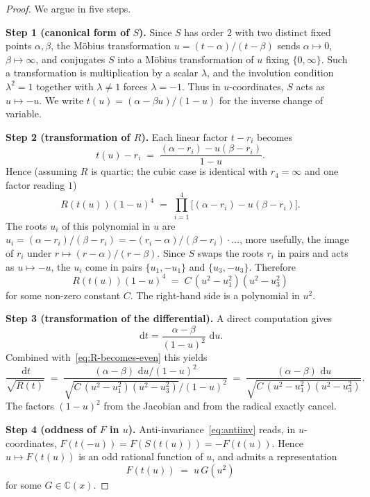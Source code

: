 \documentclass[11pt,a4paper]{article}
\theoremstyle{plain}
\theoremstyle{definition}
\theoremstyle{remark}
\newcommand{\C}{\mathbb{C}}
\renewcommand{\d}{\,\mathrm{d}}
\begin{document}
\begin{proof}
We argue in five steps.

\smallskip\noindent
\textbf{Step 1 (canonical form of $S$).}
Since $S$ has order $2$ with two distinct fixed points $\alpha,\beta$, the M\"obius transformation $u = (t-\alpha)/(t-\beta)$ sends $\alpha\mapsto 0$, $\beta\mapsto\infty$, and conjugates $S$ into a M\"obius transformation of $u$ fixing $\{0,\infty\}$. Such a transformation is multiplication by a scalar $\lambda$, and the involution condition $\lambda^2=1$ together with $\lambda\neq 1$ forces $\lambda = -1$. Thus in $u$-coordinates, $S$ acts as $u\mapsto -u$. We write $t(u) = (\alpha-\beta u)/(1-u)$ for the inverse change of variable.

\smallskip\noindent
\textbf{Step 2 (transformation of $R$).}
Each linear factor $t-r_i$ becomes
\[
  t(u) - r_i \;=\; \frac{(\alpha-r_i) - u(\beta-r_i)}{1-u}.
\]
Hence (assuming $R$ is quartic; the cubic case is identical with $r_4=\infty$ and one factor reading $1$)
\[
  R(t(u))(1-u)^4 \;=\; \prod_{i=1}^4 \big[(\alpha-r_i) - u(\beta-r_i)\big].
\]
The roots $u_i$ of this polynomial in $u$ are $u_i = (\alpha-r_i)/(\beta-r_i) = -(r_i-\alpha)/(\beta-r_i) \cdot \ldots$, more usefully, the image of $r_i$ under $r\mapsto (r-\alpha)/(r-\beta)$. Since $S$ swaps the roots $r_i$ in pairs and acts as $u\mapsto -u$, the $u_i$ come in pairs $\{u_1,-u_1\}$ and $\{u_3,-u_3\}$. Therefore
\begin{equation}\label{eq:R-becomes-even}
  R(t(u))(1-u)^4 \;=\; C\,(u^2 - u_1^2)(u^2 - u_3^2)
\end{equation}
for some non-zero constant $C$. The right-hand side is a polynomial in $u^2$.

\smallskip\noindent
\textbf{Step 3 (transformation of the differential).}
A direct computation gives
\[
  \d t = \frac{\alpha-\beta}{(1-u)^2}\,\d u.
\]
Combined with~\eqref{eq:R-becomes-even} this yields
\begin{equation}\label{eq:differential-becomes}
  \frac{\d t}{\sqrt{R(t)}} \;=\; \frac{(\alpha-\beta)\,\d u/(1-u)^2}{\sqrt{C\,(u^2-u_1^2)(u^2-u_3^2)}/(1-u)^2}
  \;=\; \frac{(\alpha-\beta)\,\d u}{\sqrt{C\,(u^2-u_1^2)(u^2-u_3^2)}}.
\end{equation}
The factors $(1-u)^2$ from the Jacobian and from the radical exactly cancel.

\smallskip\noindent
\textbf{Step 4 (oddness of $F$ in $u$).}
Anti-invariance~\eqref{eq:antiinv} reads, in $u$-coordinates, $F(t(-u)) = F(S(t(u))) = -F(t(u))$. Hence $u\mapsto F(t(u))$ is an odd rational function of $u$, and admits a representation
\[
  F(t(u)) \;=\; u\,G(u^2)
\]
for some $G\in\C(x)$.


\end{proof}
\end{document}
